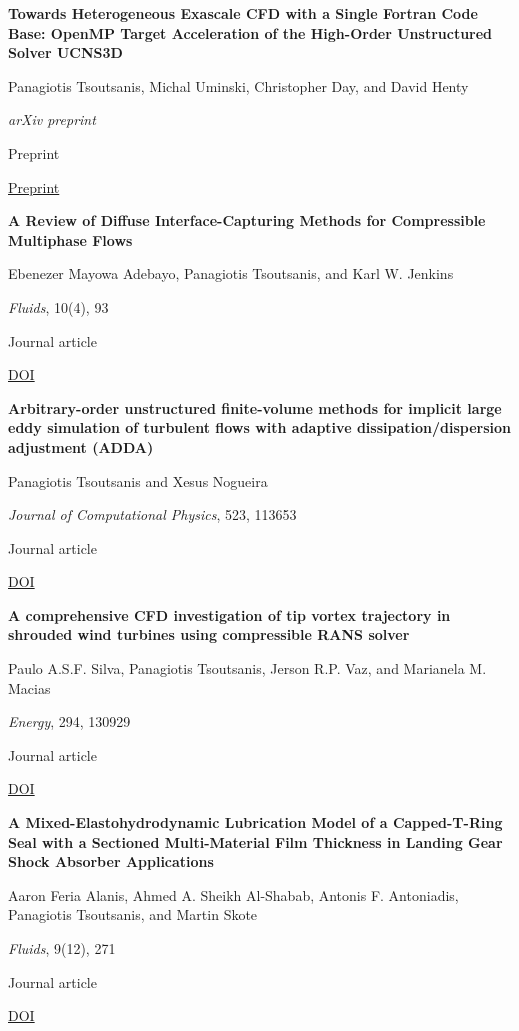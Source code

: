 \documentclass[11pt,a4paper]{article}
\newlength{\cventrysep}
\newenvironment{cventry}{%
  \par\noindent\begin{minipage}{\linewidth}
  \RaggedRight\fontsize{9.8}{12.5}\selectfont
}{\end{minipage}\par\addvspace{\cventrysep}}
\newcommand{\cvtitle}[1]{{\bfseries #1\par}\vspace{1pt}}
\newcommand{\cvdetail}[1]{{#1\par}\vspace{1pt}}
\newcommand{\cvmeta}[1]{{\fontsize{9}{11.5}\selectfont\color{Muted}#1\par}\vspace{1pt}}
\newcommand{\cvlinks}[1]{{\fontsize{9}{11.5}\selectfont #1\par}}
\newcommand{\cvyear}[1]{{\color{Teal}\bfseries\fontsize{11}{13}\selectfont #1\par}\vspace{6pt}}
\begin{document}
\begin{cventry}
\cvtitle{Towards Heterogeneous Exascale CFD with a Single Fortran Code Base: OpenMP Target Acceleration of the High-Order Unstructured Solver UCNS3D}
\cvdetail{Panagiotis Tsoutsanis, Michal Uminski, Christopher Day, and David Henty}
\cvmeta{\textit{arXiv preprint}\par Preprint}
\cvlinks{\href{https://arxiv.org/abs/2609.07387}{Preprint}}
\end{cventry}

\begin{cventry}
\cvyear{2025}
\cvtitle{A Review of Diffuse Interface-Capturing Methods for Compressible Multiphase Flows}
\cvdetail{Ebenezer Mayowa Adebayo, Panagiotis Tsoutsanis, and Karl W. Jenkins}
\cvmeta{\textit{Fluids}, 10(4), 93\par Journal article}
\cvlinks{\href{https://doi.org/10.3390/fluids10040093}{DOI}}
\end{cventry}

\begin{cventry}
\cvtitle{Arbitrary-order unstructured finite-volume methods for implicit large eddy simulation of turbulent flows with adaptive dissipation/dispersion adjustment (ADDA)}
\cvdetail{Panagiotis Tsoutsanis and Xesus Nogueira}
\cvmeta{\textit{Journal of Computational Physics}, 523, 113653\par Journal article}
\cvlinks{\href{https://doi.org/10.1016/j.jcp.2024.113653}{DOI}}
\end{cventry}

\begin{cventry}
\cvyear{2024}
\cvtitle{A comprehensive CFD investigation of tip vortex trajectory in shrouded wind turbines using compressible RANS solver}
\cvdetail{Paulo A.S.F. Silva, Panagiotis Tsoutsanis, Jerson R.P. Vaz, and Marianela M. Macias}
\cvmeta{\textit{Energy}, 294, 130929\par Journal article}
\cvlinks{\href{https://doi.org/10.1016/j.energy.2024.130929}{DOI}}
\end{cventry}

\begin{cventry}
\cvtitle{A Mixed-Elastohydrodynamic Lubrication Model of a Capped-T-Ring Seal with a Sectioned Multi-Material Film Thickness in Landing Gear Shock Absorber Applications}
\cvdetail{Aaron Feria Alanis, Ahmed A. Sheikh Al-Shabab, Antonis F. Antoniadis, Panagiotis Tsoutsanis, and Martin Skote}
\cvmeta{\textit{Fluids}, 9(12), 271\par Journal article}
\cvlinks{\href{https://doi.org/10.3390/fluids9120271}{DOI}}
\end{cventry}
\end{document}
